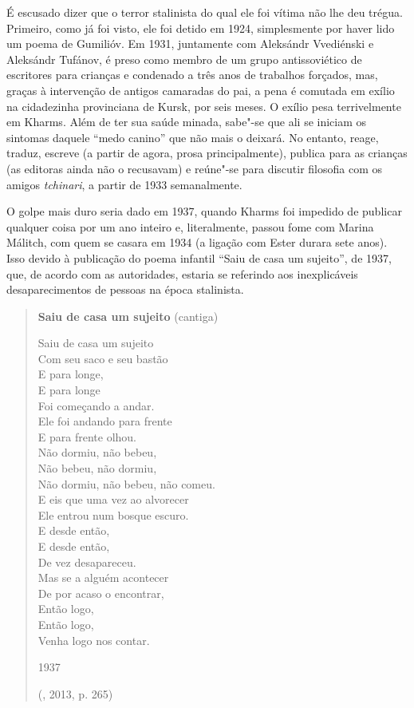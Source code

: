 É escusado dizer que o terror stalinista do qual ele foi vítima
não lhe deu trégua. Primeiro, como já foi visto, ele foi detido em
1924, simplesmente por haver lido um poema de Gumilióv. Em 1931,
juntamente com Aleksándr Vvediénski e Aleksándr Tufánov, é preso
como membro de um grupo antissoviético de escritores para crianças
e condenado a três anos de trabalhos forçados, mas, graças à
intervenção de antigos camaradas do pai, a pena é comutada em
exílio na cidadezinha provinciana de Kursk, por seis meses. O
exílio pesa terrivelmente em Kharms. Além de ter sua saúde minada,
sabe"-se que ali se iniciam os sintomas daquele ``medo canino'' que
não mais o deixará. No entanto, reage, traduz, escreve (a partir de
agora, prosa principalmente), publica para as crianças (as editoras
ainda não o recusavam) e reúne"-se para discutir filosofia com os
amigos \emph{tchinari}, a partir de 1933 semanalmente.

O golpe mais duro seria dado em 1937, quando Kharms foi impedido de publicar qualquer coisa por um ano inteiro e, literalmente, passou fome com Marina Málitch, com quem se casara em 1934 (a ligação com Ester durara sete anos). Isso devido à publicação do poema infantil ``Saiu de casa um sujeito'', de 1937, que, de acordo com as autoridades, estaria se referindo aos inexplicáveis desaparecimentos de pessoas na época stalinista. 

\begin{verse}
\textbf{Saiu de casa um sujeito}
(cantiga)

Saiu de casa um sujeito\\
Com seu saco e seu bastão\\
E para longe,\\
E para longe\\
Foi começando a andar.\\[8pt]
Ele foi andando para frente\\
E para frente olhou.\\
Não dormiu, não bebeu,\\
Não bebeu, não dormiu,\\
Não dormiu, não bebeu, não comeu.\\[8pt]
E eis que uma vez ao alvorecer\\
Ele entrou num bosque escuro.\\
E desde então, \\
E desde então,\\
De vez desapareceu.\\[8pt]
Mas se a alguém acontecer\\
De por acaso o encontrar,\\
Então logo,\\
Então logo,\\
Venha logo nos contar.

1937

(, 2013, p. 265)

\end{verse}

